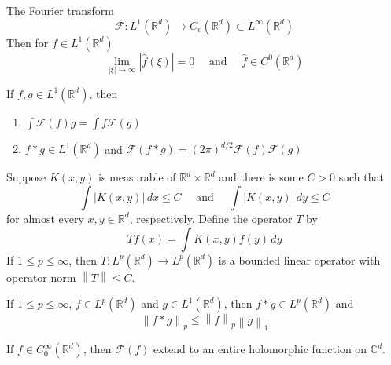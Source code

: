 \documentclass{article}
\newcommand{\norm}[1]{\left\lVert#1\right\rVert}
\newcommand{\RR}{\mathbb{R}}
\newcommand{\CC}{\mathbb{C}}
\newcommand{\FT}{\mathcal{F}}
\begin{document}
\begin{theorem}
  The Fourier transform
  \begin{equation*}
    \mathcal{F}: L^1(\mathbb{R}^d) \to C_v(\mathbb{R}^d) \subset L^\infty(\mathbb{R}^d)
  \end{equation*}
  Then for $f \in L^1(\mathbb{R}^d)$
  \begin{equation*}
    \lim_{|\xi| \to \infty}|\hat{f}(\xi)| = 0 \quad \text{ and } \quad \hat{f} \in C^0(\mathbb{R}^d)
  \end{equation*}
\end{theorem}
\begin{proposition}
  If $f,g \in L^1(\mathbb{R}^d)$, then
  \begin{enumerate}
    \item $\int \mathcal{F}(f)g = \int f\mathcal{F}(g)$ 
  \item $f * g \in L^1(\mathbb{R}^d)$ and $\mathcal{F}(f * g) = (2\pi)^{d/2}\mathcal{F}(f)\mathcal{F}(g)$
  \end{enumerate}
\end{proposition}
\begin{theorem}
  Suppose $K(x,y)$ is measurable of $\RR^d \times \RR^d$ and there is some $C > 0$ such that
  \begin{equation*}
    \int |K(x,y)| \, dx \leq C \quad \text{ and } \quad \int |K(x,y)| \, dy \leq C
  \end{equation*}
  for almost every $x,y \in \RR^d$, respectively. Define the operator $T$ by
  \begin{equation*}
    Tf(x) = \int K(x,y) f(y) \, dy
  \end{equation*}
  If $1 \leq p \leq \infty$, then $T: L^p(\RR^d) \to L^p(\RR^d)$ is a bounded linear operator with operator norm $\norm{T} \leq C$.
\end{theorem}
\begin{proposition}
  If $1 \leq p \leq \infty$, $f \in L^p(\RR^d)$ and $g \in L^1(\RR^d)$, then $f * g \in L^p(\RR^d)$ and
  \begin{equation*}
    \norm{f * g}_p \leq \norm{f}_p \norm{g}_1
  \end{equation*}
\end{proposition}

\begin{theorem}
  If $f \in C_0^\infty(\RR^d)$, then $\FT(f)$ extend to an entire holomorphic function on $\CC^d$.
\end{theorem}
\end{document}
